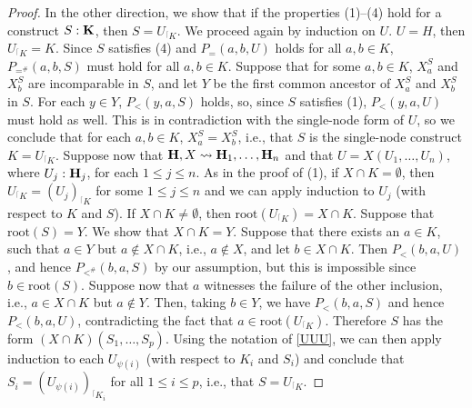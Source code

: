 \documentclass{article}
\theoremstyle{plain}
\theoremstyle{definition}
\newcommand{\restrconstr}[2]{{#1}_{{}^\lceil {#2}}}
\begin{document}
\begin{proof}
\smallskip
In the other direction, we show that if the properties (1)--(4) hold for a construct $S:{\bf K}$, then $S=\restrconstr{U}{K}$.
We proceed again by induction on $U$. $U=H$, then $\restrconstr{U}{K}=K$. Since $S$ satisfies (4) and $P_=(a,b,U)$ holds for all $a,b\in K$, $P_{=^\#}(a,b,S)$ must hold for all $a,b\in K$. Suppose that for some $a,b\in K$, $X^S_a$ and $X^S_b$ are incomparable in $S$, and let $Y$ be the first common ancestor of $X^S_a$ and $X^S_b$ in $S$. For each $y\in Y$, $P_{<}(y,a,S)$ holds, so, since $S$ satisfies (1), $P_<(y,a,U)$ must hold as well. This is in contradiction with the single-node form of $U$, so we conclude that for each $a,b\in K$,  $X^S_a=X^S_b$, i.e., that $S$ is the single-node construct $K=\restrconstr{U}{K}$. Suppose now that ${\bf H},X\leadsto {\bf H}_1,\dots,{\bf H}_n$ and that  $U=X(U_1,\dots,U_n)$, where $U_j:{\bf H}_j$, for each $1\leq j\leq n$.  As in the proof of (1), if $X\cap K=\emptyset$, then $\restrconstr{U}{K}=\restrconstr{(U_j)}{K}$ for some 
$1\leq j\leq n$ and we can apply induction to $U_j$ (with respect to $K$ and $S$). If $X\cap K\neq\emptyset$, then $\text{root}(\restrconstr{U}{K})=X\cap K$. Suppose that $\text{root}(S)=Y$. We  show that  $X\cap K=Y$.  Suppose that there exists an  $a\in K$, such that $a\in Y$ but $a\not\in X\cap K$, i.e., 
$a\not\in X$, and let $b\in X\cap K$. Then $P_<(b,a,U)$, and hence $P_{<^\#}(b,a,S)$ by our assumption, but this is impossible since $b\in \text{root}(S)$.
Suppose now that $a$ witnesses the failure of the other inclusion, i.e.,
$a\in X\cap K$ but $a\not\in Y$. Then, taking $b\in Y$, we have $P_<(b,a,S)$ and hence $P_<(b,a,U)$, contradicting the fact that $a\in \text{root}(\restrconstr{U}{K})$.  Therefore $S$ has the form $(X\cap K)(S_1,\ldots, S_p)$. 
Using the notation of \eqref{UUU},
we can then apply induction 
to each $U_{\psi(i)}$ (with respect to $K_i$ and $S_i$) and conclude 
that  $S_i=\restrconstr{(U_{\psi(i)})}{{K}_i}$ for all $1\leq i\leq p$, i.e., that $S=\restrconstr{U}{K}$. \end{proof}


\printbibliography
 
\end{document}
